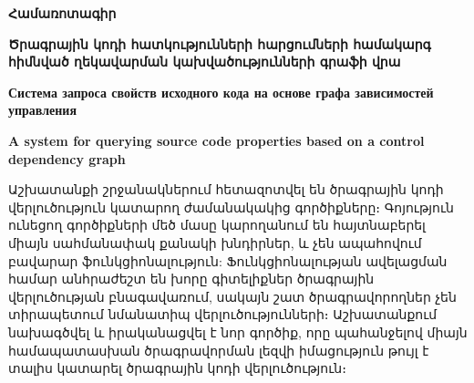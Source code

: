 {
	\thispagestyle{plain}
	\begin{center}
		\large
		\textbf{Համառոտագիր}
	\end{center}

	\begin{center}
		\vspace{0.5cm}

		\large
		\textbf{Ծրագրային կոդի հատկությունների հարցումների համակարգ հիմնված ղեկավարման կախվածությունների գրաֆի վրա}

		\vspace{0.2cm}
		\textbf{Система запроса свойств исходного кода на основе графа зависимостей управления}

		\vspace{0.2cm}
		\textbf{A system for querying source code properties based on a control dependency graph}

		\vspace{0.5cm}

	\end{center}
	Աշխատանքի շրջանակներում հետազոտվել են ծրագրային կոդի վերլուծություն կատարող ժամանակակից գործիքները։ Գոյություն ունեցող
	գործիքների մեծ մասը կարողանում են հայտնաբերել միայն սահմանափակ քանակի խնդիրներ, և չեն ապահովում բավարար
	ֆունկցիոնալություն: Ֆունկցիոնալության ավելացման համար անհրաժեշտ են խորը գիտելիքներ ծրագրային վերլուծության
	բնագավառում, սակայն շատ ծրագրավորողներ չեն տիրապետում նմանատիպ վերլուծությունների։
	Աշխատանքում նախագծվել և իրականացվել է նոր գործիք, որը պահանջելով միայն համապատասխան ծրագրավորման լեզվի իմացություն
	թույլ է տալիս կատարել ծրագրային կոդի վերլուծություն։
}